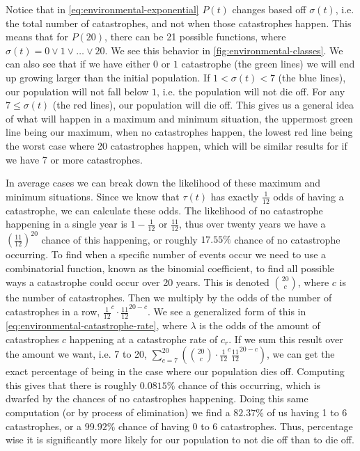 \documentclass{article}
\begin{document}
Notice that in \cref{eq:environmental-exponential} $P(t)$ changes based off $\sigma(t)$, i.e. the total number of catastrophes, and not when those catastrophes happen. This means that for $P(20)$, there can be 21 possible functions, where $\sigma(t) = 0 \lor 1 \lor \ldots \lor 20$. We see this behavior in \cref{fig:environmental-classes}. We can also see that if we have either $0$ or $1$ catastrophe (the green lines) we will end up growing larger than the initial population. If $1 < \sigma(t) < 7$ (the blue lines), our population will not fall below $1$, i.e. the population will not die off. For any $7 \le \sigma(t)$ (the red lines), our population will die off. This gives us a general idea of what will happen in a maximum and minimum situation, the uppermost green line being our maximum, when no catastrophes happen, the lowest red line being the worst case where 20 catastrophes happen, which will be similar results for if we have 7 or more catastrophes.

In average cases we can break down the likelihood of these maximum and minimum situations. Since we know that $\tau(t)$ has exactly $\frac{1}{12}$ odds of having a catastrophe, we can calculate these odds. The likelihood of no catastrophe happening in a single year is $1 - \frac{1}{12}$ or $\frac{11}{12}$, thus over twenty years we have a $\left(\frac{11}{12}\right)^{20}$ chance of this happening, or roughly $17.55\%$ chance of no catastrophe occurring. To find when a specific number of events occur we need to use a combinatorial function, known as the binomial coefficient, to find all possible ways a catastrophe could occur over 20 years. This is denoted $\binom{20}{c}$, where $c$ is the number of catastrophes. Then we multiply by the odds of the number of catastrophes in a row, $\frac{1}{12}^c \cdot \frac{11}{12}^{20-c}$. We see a generalized form of this in \cref{eq:environmental-catastrophe-rate}, where $\lambda$ is the odds of the amount of catastrophes $c$ happening at a catastrophe rate of $c_r$. If we sum this result over the amount we want, i.e. 7 to 20, $\sum_{c=7}^{20}\left(\binom{20}{c} \cdot \frac{1}{12}^c \frac{11}{12}^{20-c}\right)$, we can get the exact percentage of being in the case where our population dies off. Computing this gives that there is roughly $0.0815\%$ chance of this occurring, which is dwarfed by the chances of no catastrophes happening. Doing this same computation (or by process of elimination) we find a $82.37\%$ of us having 1 to 6 catastrophes, or a $99.92\%$ chance of having 0 to 6 catastrophes. Thus, percentage wise it is significantly more likely for our population to not die off than to die off.
\end{document}
